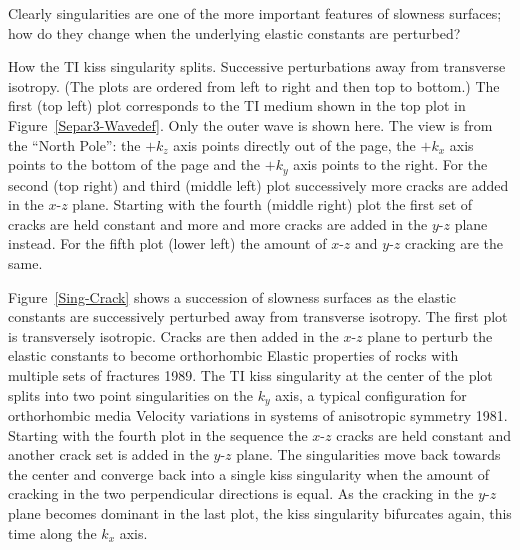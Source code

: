 Clearly singularities are one of the more important features of
slowness surfaces; how do they change when the underlying elastic
constants are perturbed?
\label{Sec-Sing}

{How the TI kiss singularity splits.}
{
\small
Successive perturbations away from transverse isotropy. (The plots
are ordered from left to right and then top to bottom.)
The first (top left) plot corresponds to the TI medium shown
in the top plot in Figure~\protect\ref{Separ3-Wavedef}.
Only the outer {} wave is shown here.
The view is from the ``North Pole'': the $+k_z$ axis points
directly out of the page, the $+k_x$ axis points to the bottom of the
page and the $+k_y$ axis points to the right.
For the second (top right) and third (middle left) plot
successively more cracks are added in the $x$-$z$ plane.
Starting with the fourth (middle right) plot the first set of cracks
are held constant and more and more cracks are added
in the $y$-$z$ plane instead. For the fifth plot (lower left)
the amount of $x$-$z$ and $y$-$z$ cracking are the same.
}

Figure~\ref{Sing-Crack} shows a succession of {} slowness surfaces
as the elastic constants are successively perturbed away from
transverse isotropy. The first plot is transversely isotropic.
Cracks are then added in the $x$-$z$ plane
to perturb the elastic
constants to become orthorhombic
{Elastic properties of rocks with multiple sets of fractures}
{1989}.
The TI kiss singularity at the center of the plot splits into
two point singularities on the $k_y$ axis,
a typical configuration for orthorhombic media
{Velocity variations in systems of anisotropic symmetry}
{1981}.
Starting with the fourth plot in the sequence the $x$-$z$ cracks
are held constant and another crack set is
added in the $y$-$z$ plane.
The singularities move back towards the center and converge
back into a single kiss singularity when the amount of cracking
in the two perpendicular directions is equal. As the cracking in
the $y$-$z$ plane becomes dominant in the last plot,
the kiss singularity bifurcates again, this time along the $k_x$ axis.

